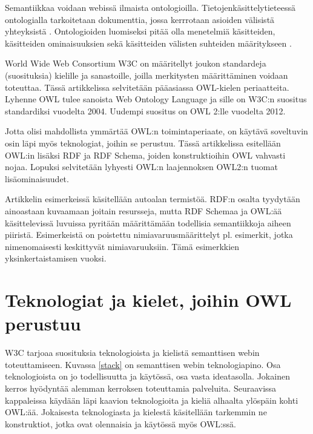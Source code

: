\documentclass[finnish]{tktltiki2}
\theoremstyle{definition}
\theoremstyle{remark}
\begin{document}
Semantiikkaa voidaan webissä ilmaista ontologioilla. Tietojenkäsittelytieteessä
ontologialla tarkoitetaan dokumenttia, jossa kerrrotaan asioiden välisistä
yhteyksistä \cite{BHL01}.
Ontologioiden luomiseksi pitää olla menetelmiä käsitteiden, käsitteiden
ominaisuuksien sekä käsitteiden välisten suhteiden määritykseen
\cite{BHL01}. 

World Wide Web Consortium W3C on määritellyt 
joukon standardeja (suosituksia) kielille ja sanastoille, joilla merkitysten määrittäminen voidaan toteuttaa.
Tässä artikkelissa selvitetään pääasiassa OWL-kielen periaatteita. Lyhenne OWL tulee sanoista Web Ontology Language ja sille on
W3C:n suositus standardiksi vuodelta 2004. Uudempi suositus on OWL 2:lle vuodelta 2012. 

Jotta olisi mahdollista ymmärtää OWL:n toimintaperiaate, on käytävä soveltuvin osin läpi myös teknologiat, joihin
se perustuu. Tässä artikkelissa esitellään OWL:in lisäksi RDF ja RDF Schema, joiden konstruktioihin OWL vahvasti nojaa. 
Lopuksi selvitetään lyhyesti OWL:n laajennoksen OWL2:n tuomat lisäominaisuudet.

Artikkelin esimerkeissä käsitellään autoalan termistöä. RDF:n osalta tyydytään ainoastaan kuvaamaan joitain resursseja, 
mutta RDF Schemaa ja OWL:ää käsittelevissä luvuissa pyritään määrittämään todellisia semantiikkoja aiheen piiristä. Esimerkeistä on poistettu nimiavaruusmäärittelyt
pl. esimerkit, jotka nimenomaisesti keskittyvät nimiavaruuksiin. Tämä esimerkkien yksinkertaistamisen vuoksi. 

\section{Teknologiat ja kielet, joihin OWL perustuu}
W3C tarjoaa suosituksia teknologioista ja
kielistä  semanttisen webin toteuttamiseen. Kuvassa \ref{stack} on semanttisen webin teknologiapino.
Osa teknologioista on jo todellisuutta ja
käytössä, osa vasta ideatasolla. Jokainen kerros hyödyntää alemman kerroksen toteuttamia
palveluita. Seuraavissa kappaleissa käydään läpi kaavion teknologioita ja kieliä
alhaalta ylöspäin kohti OWL:ää. Jokaisesta teknologiasta ja kielestä käsitellään tarkemmin
ne konstruktiot, jotka ovat olennaisia ja käytössä myös OWL:ssä.
\end{document}
